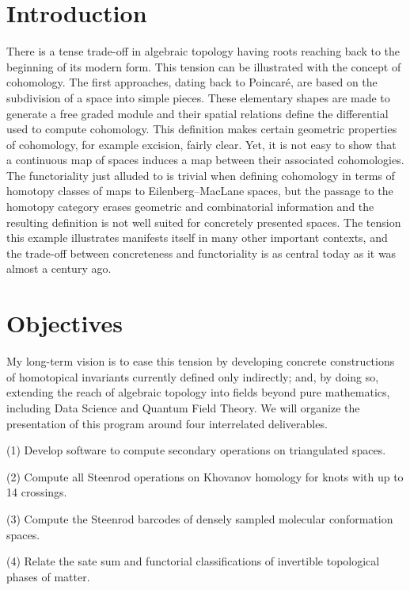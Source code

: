
\section*{Introduction} \label{s:introduction}

There is a tense trade-off in algebraic topology having roots reaching back to the beginning of its modern form.
This tension can be illustrated with the concept of cohomology.
The first approaches, dating back to Poincar\'e, are based on the subdivision of a space into simple pieces.
These elementary shapes are made to generate a free graded module and their spatial relations define the differential used to compute cohomology.
This definition makes certain geometric properties of cohomology, for example excision, fairly clear.
Yet, it is not easy to show that a continuous map of spaces induces a map between their associated cohomologies.
The functoriality just alluded to is trivial when defining cohomology in terms of homotopy classes of maps to Eilenberg--MacLane spaces, but the passage to the homotopy category erases geometric and combinatorial information and the resulting definition is not well suited for concretely presented spaces.
The tension this example illustrates manifests itself in many other important contexts, and the trade-off between concreteness and functoriality is as central today as it was almost a century ago.

\section*{Objectives}

My long-term vision is to ease this tension by developing concrete constructions of homotopical invariants currently defined only indirectly; and, by doing so, extending the reach of algebraic topology into fields beyond pure mathematics, including Data Science and Quantum Field Theory.
We will organize the presentation of this program around four interrelated deliverables.

\smallskip
\quad (1) Develop software to compute secondary operations on triangulated spaces.\par
\quad (2) Compute all Steenrod operations on Khovanov homology for knots with up to 14 crossings.\par
\quad (3) Compute the Steenrod barcodes of densely sampled molecular conformation spaces.\par
\quad (4) Relate the sate sum and functorial classifications of invertible topological phases of matter.\par